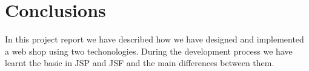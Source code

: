 \section{Conclusions}
\label{sec.conclusions}
In this project report we have described how we have designed and implemented a
web shop using two techonologies. During the development process we have learnt
the basic in JSP and JSF and the main differences between them.
